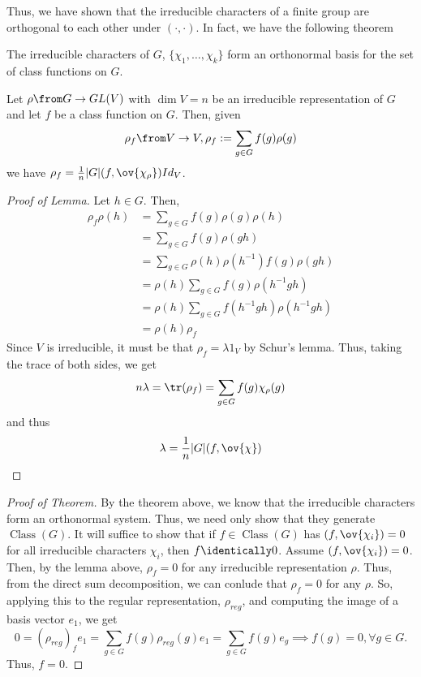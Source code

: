 \documentclass[11pt,leqno,oneside]{amsbook}
\newcommand{\Class}{\operatorname{Class}}
\numberwithin{thm}{section}
\begin{document}
Thus, we have shown that the irreducible characters of a finite group
are orthogonal to each other under \((\cdot, \cdot)\). In fact, we
have the following theorem
\begin{thm}
  The irreducible characters of \(G\), \(\{\chi_1, \ldots, \chi_k\}\) form an orthonormal basis for
  the set of class functions on \(G\). 
\end{thm}
\begin{lem}
  Let \(\rho \from G \to GL(V)\) with \(\dim V = n\) be an irreducible
  representation of \(G\) and let \(f\) 
  be a class function on \(G\). Then, given \[
    \rho_f \from V \to V, \rho_f := \sum_{g \in G} f(g)\rho(g)
  \]
  we have \(\rho_f = \frac{1}{n}|G| (f, \ov{\chi_\rho}) Id_V\).
\end{lem}
\begin{proof}[Proof of Lemma]
  Let \(h \in G\). Then,
  \begin{align*}
    \rho_f \rho(h) & = \sum_{g \in G} f(g) \rho(g) \rho(h) \\
                   & = \sum_{g \in G} f(g) \rho(gh) \\
                   & = \sum_{g \in G} \rho(h) \rho(h^{-1}) f(g) \rho(gh) \\
                   & = \rho(h) \sum_{g \in G} f(g) \rho(h^{-1}gh) \\
                   & = \rho(h) \sum_{g \in G} f(h^{-1}gh) \rho(h^{-1}gh) \\
    & = \rho(h) \rho_f
  \end{align*}
  Since \(V\) is irreducible, it must be that \(\rho_f = \lambda 1_V\)
  by Schur's lemma. Thus, taking the trace of both sides, we get \[
    n \lambda = \tr(\rho_f) = \sum_{g \in G} f(g) \chi_\rho(g)
  \]
  and thus \[
    \lambda = \frac{1}{n} |G| (f, \ov{\chi})
  \]
\end{proof}
\begin{proof}[Proof of Theorem]
  By the theorem above, we know that the irreducible characters form
  an orthonormal system. Thus, we need only show that they generate
  \(\Class(G)\). It will suffice to show that if \(f \in \Class(G)\)
  has \((f,\ov{\chi_i}) = 0\) for all irreducible characters
  \(\chi_i\), then \(f \identically 0\). Assume \((f,\ov{\chi_i}) =
  0\). Then, by the lemma above, \(\rho_f = 0\) for any irreducible
  representation \(\rho\). Thus, from the direct sum decomposition, we
  can conlude that \(\rho_f = 0\) for any \(\rho\). So, applying this
  to the regular representation, \(\rho_{reg}\), and computing the
  image of a basis vector \(e_1\), we get \[
    0 = (\rho_{reg})_f e_1 = \sum_{g \in G} f(g) \rho_{reg}(g) e_1 = \sum_{g
      \in G} f(g) e_g \implies f(g) = 0, \forall g \in G. 
  \]
  Thus, \(f = 0\).
\end{proof}
\end{document}
